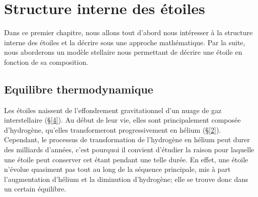 


\chapter{Structure interne des étoiles}\label{1}
Dans ce premier chapitre, nous allons tout d'abord nous intéresser à la structure interne des étoiles et la décrire sous une approche mathématique. Par la suite, nous aborderons un modèle stellaire nous permettant de décrire une étoile en fonction de sa composition.

\section{Equilibre thermodynamique}\label{1.1}

Les étoiles naissent de l'effondrement gravitationnel d'un nuage de gaz interstellaire (§\ref{4}). Au début de leur vie, elles sont principalement composée d'hydrogène, qu'elles transformeront progressivement en hélium (§\ref{2}). Cependant, le processus de transformation de l'hydrogène en hélium peut durer des milliards d'années, c'est pourquoi il convient d'étudier la raison pour laquelle une étoile peut conserver cet étant pendant une telle durée. En effet, une étoile n'évolue quasiment pas tout au long de la séquence principale\footnotemark[1], mis à part l'augmentation d'hélium et la diminution d'hydrogène; elle se trouve donc dans un certain équilibre.
















\vfill
{}